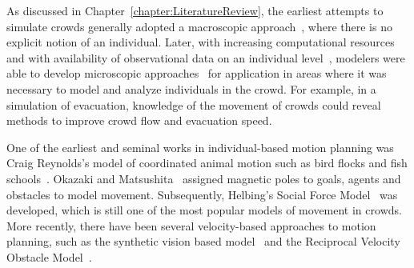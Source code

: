 
As discussed in Chapter~\ref{chapter:LiteratureReview}, the earliest attempts to simulate crowds generally adopted a macroscopic approach~\cite{Henderson:1974ve,WattsJr:1987tx}, where there is no explicit notion of an individual.
Later, with increasing computational resources and with availability of observational data on an individual level~\cite{CGF:CGF1090, HuNan2013, JOHANSSON2008}, modelers were able to develop microscopic approaches~\cite{Reynolds:1987vm,Helbing:1995ie} for application in areas where it was necessary to model and analyze individuals in the crowd.
For example, in a simulation of evacuation, knowledge of the movement of crowds could reveal methods to improve crowd flow and evacuation speed.

One of the earliest and seminal works in individual-based motion planning was Craig Reynolds's model of coordinated animal motion such as bird flocks and fish schools~\cite{Reynolds:1987vm}. Okazaki and Matsushita~\cite{Okazaki:1993wh} assigned magnetic poles to goals, agents and obstacles to model movement. Subsequently, Helbing's Social Force Model~\cite{Helbing:1995ie} was developed, which is still one of the most popular models of movement in crowds. More recently, there have been several velocity-based approaches to motion planning, such as the synthetic vision based model~\cite{Ondrej:2010hv} and the Reciprocal Velocity Obstacle Model~\cite{vandenBerg:2011ww,Guy:2010ko,vandenBerg:2008fu}.


